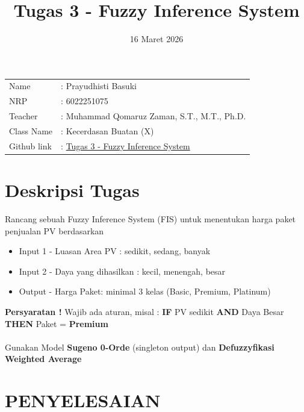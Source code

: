 \documentclass{article}
\title {Tugas 3 - Fuzzy Inference System 
}
\date{16 Maret 2026}
\begin{document}
\maketitle

\noindent\begin{tabular}{@{}ll}
     Name &: Prayudhisti Basuki\\
     NRP &: 6022251075\\
     Teacher &: Muhammad Qomaruz Zaman, S.T., M.T., Ph.D.\\
     Class Name &: Kecerdasan Buatan (X)\\
     Github link &:  \href{https://github.com/kunthengx/tugas_kecerdasan_buatan/blob/c3d79eb01ee79165f0499d08e516e762eb2188eb/tugas3_fuzzy_inference.ipynb}{Tugas 3 - Fuzzy Inference System} \\
\end{tabular}
\vspace{0.75cm}

\section*{Deskripsi Tugas}

Rancang sebuah Fuzzy Inference System (FIS) untuk menentukan harga paket penjualan PV berdasarkan 

\begin{itemize}
    \item   Input 1 - Luasan Area PV : sedikit, sedang, banyak
    \item   Input 2 - Daya yang dihasilkan : kecil, menengah, besar
    \item   Output - Harga Paket: minimal 3 kelas (Basic, Premium, Platinum)
\end{itemize}

\setlength{\parindent}{0pt}
\textbf{Persyaratan !} Wajib ada aturan, misal :
\textbf{IF} PV sedikit \textbf{AND} Daya Besar \textbf{THEN} Paket = \textbf{Premium}\\
\\
Gunakan Model \textbf{Sugeno 0-Orde} (singleton output) dan \textbf{Defuzzyfikasi Weighted Average}
\\

\section*{PENYELESAIAN}
\end{document}
